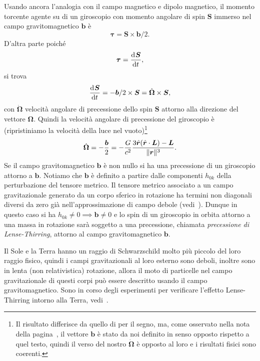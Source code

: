 Usando ancora l'analogia con il campo magnetico e dipolo magnetico,
il momento torcente agente su di un giroscopio con momento angolare di spin
$\bm{S}$ immerso nel campo gravitomagnetico $\bm{b}$ è
\begin{equation}
  \bm{\tau} = \bm{S} \times \bm{b}/2.
\end{equation}
D'altra parte poiché
\begin{equation}
  \bm{\tau} = \frac{{\mathop{}\!\mathrm{d}^{}}\bm{S}}{\mathop{}\!\mathrm{d} {t}^{}},
\end{equation}
si trova
\begin{equation}
  \frac{{\mathop{}\!\mathrm{d}^{}}\bm{S}}{\mathop{}\!\mathrm{d} {t}^{}} = - \bm{b}/2 \times \bm{S} = \dot{\bm{\Omega}} \times
  \bm{S},
\end{equation}
con $\dot{\bm{\Omega}}$ velocità angolare di precessione dello spin $\bm{S}$
attorno alla direzione del vettore $\bm{\Omega}$.  Quindi la velocità angolare
di precessione del giroscopio è (ripristiniamo la velocità della luce nel
vuoto)\footnote{Il risultato differisce da quello di
  \textcite[193]{ohanian:gravitazione} per il segno, ma, come osservato nella
  nota della pagina~\pageref{nota-b}, il vettore $\bm{b}$ è stato da noi
  definito in senso opposto rispetto a quel testo, quindi il verso del nostro
  $\dot{\bm{\Omega}}$ è opposto al loro e i risultati fisici sono coerenti.}
\begin{equation}
  \dot{\bm{\Omega}} = -\frac{\bm{b}}{2} =
  -\frac{G}{c^{2}}\frac{3\hat{\bm{r}}(\hat{\bm{r}} \cdot \bm{L}) -
    \bm{L}}{\lVert\bm{r}\rVert^{3}}.
\end{equation}
Se il campo gravitomagnetico $\bm{b}$ è non nullo si ha una precessione di un
giroscopio attorno a $\bm{b}$.  Notiamo che $\bm{b}$ è definito a partire dalle
componenti $h_{0k}$ della perturbazione del tensore metrico.  Il tensore metrico
associato a un campo gravitazionale generato da un corpo sferico in rotazione ha
termini non diagonali diversi da zero già nell'approssimazione di campo debole
(vedi~\textcite[192]{ohanian:gravitazione}).  Dunque in questo caso si ha
$h_{0k} \neq 0 \implies \bm{b} \neq 0$ e lo spin di un giroscopio in orbita
attorno a una massa in rotazione sarà soggetto a una precessione, chiamata
 \emph{precessione di Lense-Thirring},
attorno al campo gravitomagnetico $\bm{b}$.

Il Sole e la Terra hanno un raggio di Schwarzschild molto più piccolo del loro
raggio fisico, quindi i campi gravitazionali al loro esterno sono deboli,
inoltre sono in lenta (non relativistica) rotazione, allora il moto di
particelle nel campo gravitazionale di questi corpi può essere descritto usando
il campo gravitomagnetico.  Sono in corso degli esperimenti per verificare
l'effetto Lense-Thirring intorno alla Terra,
vedi~\textcite[193-195]{ohanian:gravitazione}.

